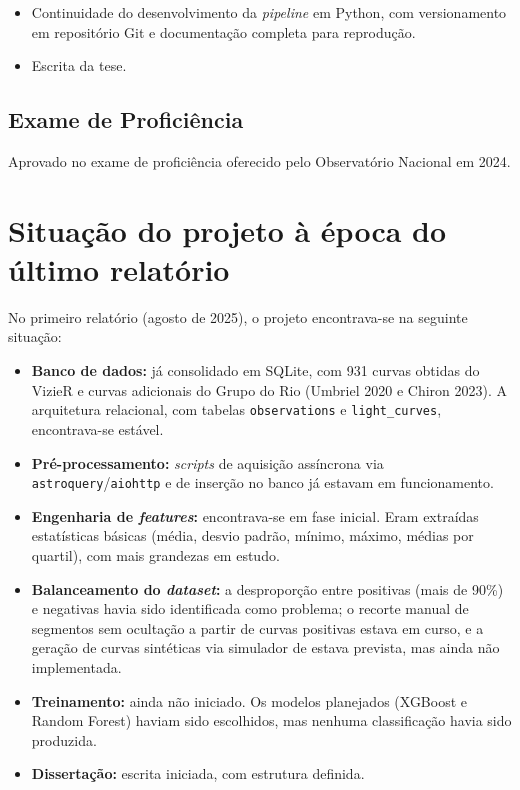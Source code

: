 \documentclass[12pt]{article}
\numberwithin{equation}{section}
\begin{document}
\begin{itemize}
    \item Continuidade do desenvolvimento da \textit{pipeline} em Python, com versionamento em repositório Git e documentação completa para reprodução.
    \item Escrita da tese.
\end{itemize}

\subsection{Exame de Proficiência}

Aprovado no exame de proficiência oferecido pelo Observatório Nacional em 2024.


\section{Situação do projeto à época do último relatório}

No primeiro relatório (agosto de 2025), o projeto encontrava-se na seguinte situação:

\begin{itemize}
    \item \textbf{Banco de dados:} já consolidado em SQLite, com 931 curvas obtidas do VizieR e curvas adicionais do Grupo do Rio (Umbriel 2020 e Chiron 2023). A arquitetura relacional, com tabelas \texttt{observations} e \texttt{light\_curves}, encontrava-se estável.

    \item \textbf{Pré-processamento:} \textit{scripts} de aquisição assíncrona via \texttt{astroquery}/\texttt{aiohttp} e de inserção no banco já estavam em funcionamento.

    \item \textbf{Engenharia de \textit{features}:} encontrava-se em fase inicial. Eram extraídas estatísticas básicas (média, desvio padrão, mínimo, máximo, médias por quartil), com mais grandezas em estudo.

    \item \textbf{Balanceamento do \textit{dataset}:} a desproporção entre positivas (mais de 90\%) e negativas havia sido identificada como problema; o recorte manual de segmentos sem ocultação a partir de curvas positivas estava em curso, e a geração de curvas sintéticas via simulador de \cite{Simulator} estava prevista, mas ainda não implementada.

    \item \textbf{Treinamento:} ainda não iniciado. Os modelos planejados (XGBoost e Random Forest) haviam sido escolhidos, mas nenhuma classificação havia sido produzida.

    \item \textbf{Dissertação:} escrita iniciada, com estrutura definida.
\end{itemize}
\end{document}

